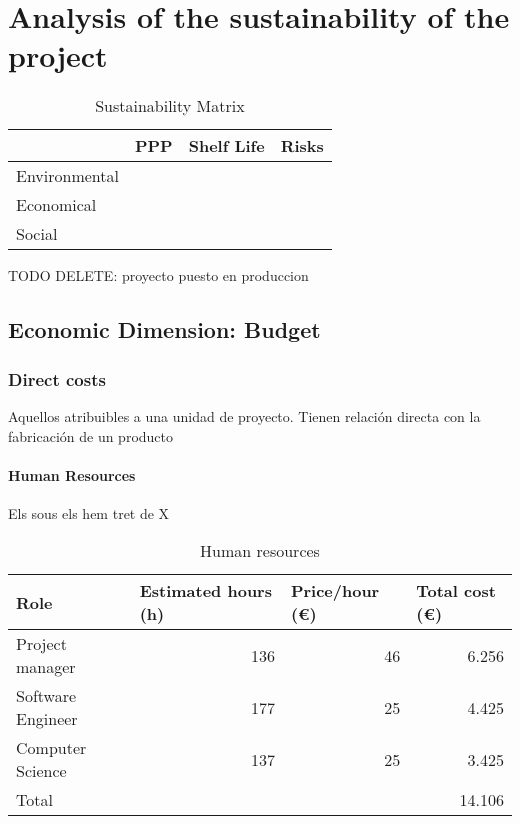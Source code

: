 \chapter{Analysis of the sustainability of the project}
\label{Chapter2}

\begin{table}[h]
	\centering
	\begin{tabular}{l|l|l|l|}
		\cline{2-4}
											& PPP & Shelf Life & Risks \\ \hline
		\multicolumn{1}{|l|}{Environmental} &     &            &       \\ \hline
		\multicolumn{1}{|l|}{Economical}    &     &            &       \\ \hline
		\multicolumn{1}{|l|}{Social}        &     &            &       \\ \hline
	\end{tabular}
	\caption{Sustainability Matrix}
	\label{SustainabilityMatrix}
\end{table}
TODO DELETE: proyecto puesto en produccion

\section{Economic Dimension: Budget}
\subsection{Direct costs}
Aquellos atribuibles a una unidad de proyecto. Tienen
relación directa con la fabricación de un producto

\subsubsection{Human Resources}
Els sous els hem tret de X

\begin{table}[h!]
	\centering
	\begin{tabular}{|l|r|r|r|}
		\hline
		Role              & \multicolumn{1}{l|}{Estimated hours (h)} & \multicolumn{1}{l|}{Price/hour (€)} & \multicolumn{1}{l|}{Total cost (€)} \\ \hline
		Project manager   & 136                                      & 46                                  & 6.256                               \\ \hline
		Software Engineer & 177                                      & 25                                  & 4.425                               \\ \hline
		Computer Science  & 137                                      & 25                                  & 3.425                               \\ \hline\hline
		Total             & \multicolumn{3}{r|}{14.106}                                                                                          \\ \hline
	\end{tabular}
	\caption{Human resources}
	\label{HumanResources}
\end{table}

